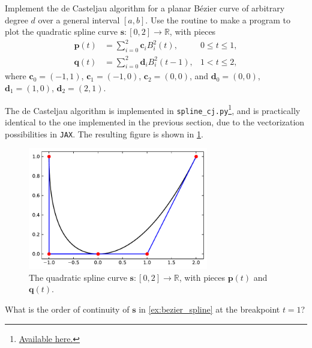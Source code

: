 \begin{exercise}{2.2}\label{ex:bezier_spline}
    Implement the de Casteljau algorithm for a planar Bézier curve of arbitrary degree $d$ over a general interval $[a, b]$.
    Use the routine to make a program to plot the quadratic spline curve $\mathbf{s} : [0, 2] \to \mathbb{R}$, with pieces
    \begin{align*}
        \mathbf{p}(t) &= \sum_{i=0}^{2} \mathbf{c}_i B_{i}^2(t), & 0 \leq t \leq 1, \\
        \mathbf{q}(t) &= \sum_{i=0}^{2} \mathbf{d}_i B_{i}^2(t - 1), & 1 < t \leq 2,
    \end{align*}
    where $\mathbf{c}_0 = (-1, 1)$, $\mathbf{c}_1 = (-1, 0)$, $\mathbf{c}_2 = (0, 0)$, and $\mathbf{d}_0 = (0, 0)$, $\mathbf{d}_1 = (1, 0)$, $\mathbf{d}_2 = (2, 1)$.
\end{exercise}

\begin{solution}{2.2}
    The de Casteljau algorithm is implemented in \verb|spline_cj.py|\footnote{\href{https://github.com/augustfe/MAT4170/blob/main/doc/2_splines_in_bb/spline_cj.py}{Available here.}}, and is practically identical to the one implemented in the previous section, due to the vectorization possibilities in \verb|JAX|.
    The resulting figure is shown in \cref{fig:bezier_spline}.
    \begin{figure}[ht]
        \centering
        \includegraphics[width=0.7\textwidth]{../doc/2_splines_in_bb/bezier_casteljau.pdf}
        \caption{The quadratic spline curve $\mathbf{s} : [0, 2] \to \mathbb{R}$, with pieces $\mathbf{p}(t)$ and $\mathbf{q}(t)$.\label{fig:bezier_spline}}
    \end{figure}
\end{solution}

\begin{exercise}{2.3}
    What is the order of continuity of $\mathbf{s}$ in \cref{ex:bezier_spline} at the breakpoint $t = 1$?
\end{exercise}

